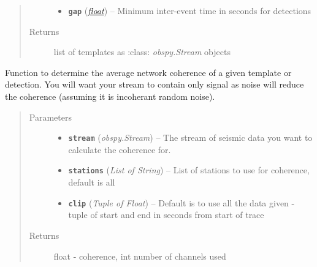 \documentclass[a4paper,10pt,english]{sphinxmanual}
\begin{document}
\begin{fulllineitems}
\begin{quote}
\begin{description}
\begin{itemize}
\item {} 
\textbf{\texttt{gap}} (\href{https://docs.python.org/library/functions.html\#float}{\emph{float}}) -- Minimum inter-event time in seconds for detections

\end{itemize}

\item[{Returns}] \leavevmode
list of templates as :class: \emph{obspy.Stream} objects

\end{description}\end{quote}

\end{fulllineitems}


\begin{fulllineitems}
\label{core:bright_lights.coherence}
Function to determine the average network coherence of a given template or
detection.  You will want your stream to contain only signal as noise
will reduce the coherence (assuming it is incoherant random noise).
\begin{quote}\begin{description}
\item[{Parameters}] \leavevmode\begin{itemize}
\item {} 
\textbf{\texttt{stream}} (\emph{obspy.Stream}) -- The stream of seismic data you want to calculate the            coherence for.

\item {} 
\textbf{\texttt{stations}} (\emph{List of String}) -- List of stations to use for coherence, default is all

\item {} 
\textbf{\texttt{clip}} (\emph{Tuple of Float}) -- Default is to use all the data given -             tuple of start and end in seconds from start of trace

\end{itemize}

\item[{Returns}] \leavevmode
float - coherence, int number of channels used

\end{description}\end{quote}

\end{fulllineitems}
\end{document}
